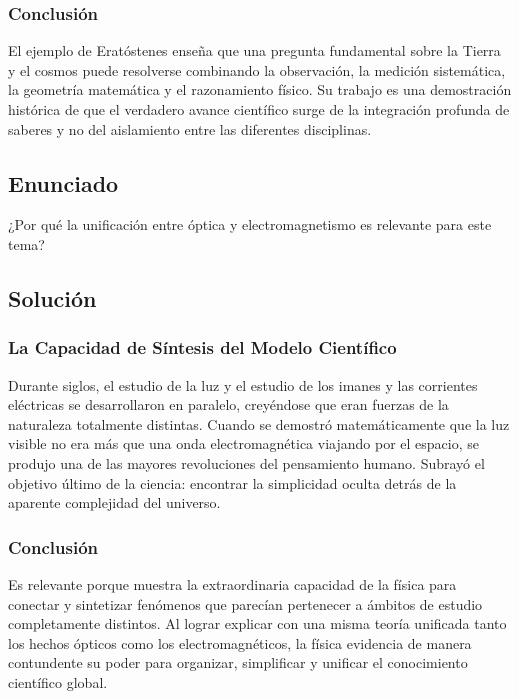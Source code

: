 \documentclass[12pt, a4paper]{article}
\begin{document}
\subsubsection*{Conclusión}
El ejemplo de Eratóstenes enseña que una pregunta fundamental sobre la Tierra y el cosmos puede resolverse combinando la observación, la medición sistemática, la geometría matemática y el razonamiento físico. Su trabajo es una demostración histórica de que el verdadero avance científico surge de la integración profunda de saberes y no del aislamiento entre las diferentes disciplinas.

\newpage

\subsection*{Enunciado}
¿Por qué la unificación entre óptica y electromagnetismo es relevante para este tema?

\subsection*{Solución}

\subsubsection*{La Capacidad de Síntesis del Modelo Científico}
Durante siglos, el estudio de la luz y el estudio de los imanes y las corrientes eléctricas se desarrollaron en paralelo, creyéndose que eran fuerzas de la naturaleza totalmente distintas. Cuando se demostró matemáticamente que la luz visible no era más que una onda electromagnética viajando por el espacio, se produjo una de las mayores revoluciones del pensamiento humano. Subrayó el objetivo último de la ciencia: encontrar la simplicidad oculta detrás de la aparente complejidad del universo.

\subsubsection*{Conclusión}
Es relevante porque muestra la extraordinaria capacidad de la física para conectar y sintetizar fenómenos que parecían pertenecer a ámbitos de estudio completamente distintos. Al lograr explicar con una misma teoría unificada tanto los hechos ópticos como los electromagnéticos, la física evidencia de manera contundente su poder para organizar, simplificar y unificar el conocimiento científico global.
\end{document}
